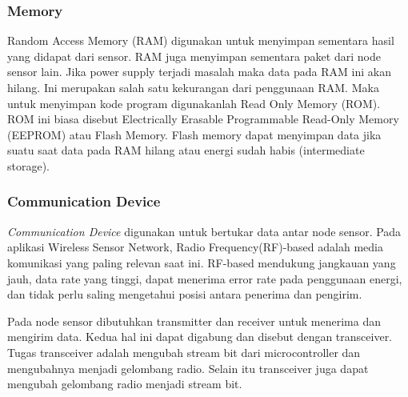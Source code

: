 \subsubsection{Memory}
Random Access Memory (RAM) digunakan untuk menyimpan sementara hasil yang didapat dari sensor. RAM juga menyimpan sementara paket dari node sensor lain. Jika power supply terjadi masalah maka data pada RAM ini akan hilang. Ini merupakan salah satu kekurangan dari penggunaan RAM. Maka untuk menyimpan kode program digunakanlah Read Only Memory (ROM). ROM ini biasa disebut Electrically Erasable Programmable Read-Only Memory (EEPROM) atau Flash Memory. Flash memory dapat menyimpan data jika suatu saat data pada RAM hilang atau energi sudah habis (intermediate storage).

\subsubsection{Communication Device}
\textit{Communication Device} digunakan untuk bertukar data antar node sensor. Pada aplikasi Wireless Sensor Network, Radio Frequency(RF)-based adalah media komunikasi yang paling relevan saat ini. RF-based mendukung jangkauan yang jauh, data rate yang tinggi, dapat menerima error rate pada penggunaan energi, dan tidak perlu saling mengetahui posisi antara penerima dan pengirim.

Pada node sensor dibutuhkan transmitter dan receiver untuk menerima dan mengirim data. Kedua hal ini dapat digabung dan disebut dengan transceiver. Tugas transceiver adalah mengubah stream bit dari microcontroller dan mengubahnya menjadi gelombang radio. Selain itu transceiver juga dapat mengubah gelombang radio menjadi stream bit.

